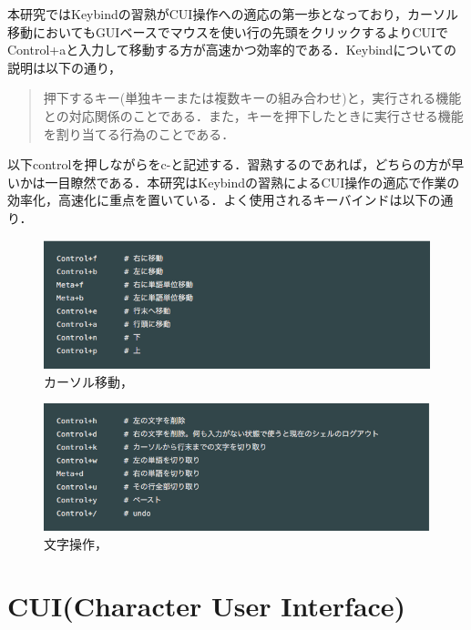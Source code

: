 本研究ではKeybindの習熟がCUI操作への適応の第一歩となっており，カーソル移動においてもGUIベースでマウスを使い行の先頭をクリックするよりCUIでControl+aと入力して移動する方が高速かつ効率的である．Keybindについての説明は以下の通り，
\begin{quotation}
押下するキー(単独キーまたは複数キーの組み合わせ)と，実行される機能との対応関係のことである．また，キーを押下したときに実行させる機能を割り当てる行為のことである． \cite{keybind}
\end{quotation}
以下controlを押しながらをc-と記述する．習熟するのであれば，どちらの方が早いかは一目瞭然である．本研究はKeybindの習熟によるCUI操作の適応で作業の効率化，高速化に重点を置いている．よく使用されるキーバインドは以下の通り．
\begin{figure}[H]
\centering
\begin{center}
\includegraphics[width=150mm]{../../picture/keybind1.png}
\end{center}
\caption{カーソル移動，\label{sample}}
\end{figure}

\begin{figure}[H]
\centering
\begin{center}
\includegraphics[width=150mm]{../../picture/keybind2.png}
\end{center}
\caption{文字操作，\label{sample}}
\end{figure}

    \section{CUI(Character User
Interface)}\label{cuicharacter-user-interface}

